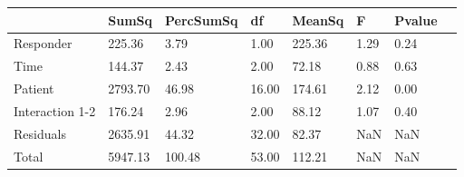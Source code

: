 \begin{tabular}{llllllll}
 & SumSq & PercSumSq & df & MeanSq & F & Pvalue \\ 
 \hline 
Responder & 225.36 & 3.79 & 1.00 & 225.36 & 1.29 & 0.24 \\ 
Time & 144.37 & 2.43 & 2.00 & 72.18 & 0.88 & 0.63 \\ 
Patient & 2793.70 & 46.98 & 16.00 & 174.61 & 2.12 & 0.00 \\ 
Interaction 1-2 & 176.24 & 2.96 & 2.00 & 88.12 & 1.07 & 0.40 \\ 
Residuals & 2635.91 & 44.32 & 32.00 & 82.37 & NaN & NaN \\ 
Total & 5947.13 & 100.48 & 53.00 & 112.21 & NaN & NaN \\ 
\end{tabular} 
